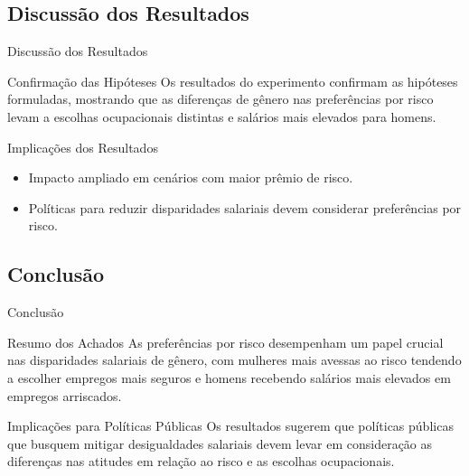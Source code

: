 \documentclass[aspectratio=169, xcolor={dvipsnames}, 10pt, brazil]{beamer}
\begin{document}
\subsection{Discussão dos Resultados}
\begin{frame}{Discussão dos Resultados}

    \begin{block}{Confirmação das Hipóteses}
        Os resultados do experimento confirmam as hipóteses formuladas, mostrando que as diferenças de gênero nas preferências por risco levam a escolhas ocupacionais distintas e salários mais elevados para homens.
    \end{block}

    \begin{block}{Implicações dos Resultados}
        \begin{itemize}
            \item Impacto ampliado em cenários com maior prêmio de risco.
            \item Políticas para reduzir disparidades salariais devem considerar preferências por risco.
        \end{itemize}
    \end{block}

\end{frame}

\subsection{Conclusão}
\begin{frame}{Conclusão}

    \begin{block}{Resumo dos Achados}
        As preferências por risco desempenham um papel crucial nas disparidades salariais de gênero, com mulheres mais avessas ao risco tendendo a escolher empregos mais seguros e homens recebendo salários mais elevados em empregos arriscados.
    \end{block}

    \begin{block}{Implicações para Políticas Públicas}
        Os resultados sugerem que políticas públicas que busquem mitigar desigualdades salariais devem levar em consideração as diferenças nas atitudes em relação ao risco e as escolhas ocupacionais.
    \end{block}

\end{frame}

\end{document}
